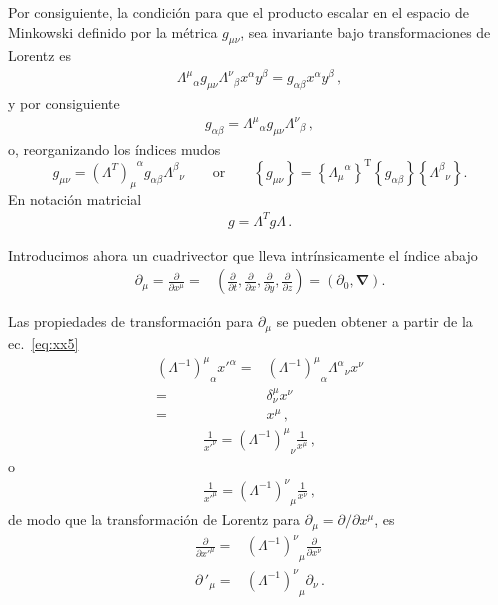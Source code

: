 \begin{frame}
Por consiguiente, la condición para que el producto escalar  en el espacio de Minkowski definido por la métrica $g_{\mu\nu}$, sea invariante bajo transformaciones de Lorentz es
\begin{align}
  {\Lambda^{\mu}}_{\alpha}g_{\mu\nu}{\Lambda^{\nu}}_{\beta}x^{\alpha}y^{\beta}=
  g_{\alpha\beta}x^{\alpha}y^{\beta}\,,
\end{align}
y por consiguiente
\begin{align}
  g_{\alpha\beta}={\Lambda^{\mu}}_{\alpha}g_{\mu\nu}{\Lambda^{\nu}}_{\beta}\,,
\end{align}
o, reorganizando los índices mudos
\begin{equation}
  \label{eq:lrinv}
  g_{\mu\nu}={(\Lambda^{T})_{\mu}}^\alpha g_{\alpha\beta}{\Lambda^\beta}_{\nu}\qquad\text{or}\qquad 
\left\{g_{\mu\nu}\right\}=\left\{{\Lambda_{\mu}}^{\alpha}\right\}^{\text{T}}\left\{g_{\alpha\beta}\right\}\left\{{\Lambda^\beta}_{\nu}\right\}.
\end{equation}
En notaci\'on matricial
\begin{align}
 g=\Lambda^T g \Lambda\,. 
\end{align}

Introducimos ahora un cuadrivector que lleva intrínsicamente el índice abajo
\begin{align}
   \partial_\mu=\frac{\partial}{\partial x^\mu}=&\left(
    \frac{\partial}{\partial t},\frac{\partial}{\partial x},\frac{\partial}{\partial y},\frac{\partial}{\partial z}
  \right)
  =(\partial_0,\boldsymbol{\nabla}).
\end{align}



Las propiedades de transformación para $\partial_\mu$ se pueden obtener a partir de la ec.~\eqref{eq:xx5}
\begin{align}
  {\left(\Lambda^{-1}\right)^\mu}_\alpha{x'}^\alpha=&{\left(\Lambda^{-1}\right)^\mu}_\alpha{\Lambda^\alpha}_\nu x^\nu\nonumber\\
=&\delta^\mu_\nu x^\nu\nonumber\\
=&x^\mu\,,
\end{align}
\begin{align}
  \frac{1}{{x'}^\nu}= {\left(\Lambda^{-1}\right)^\mu}_\nu\frac{1}{x^\mu}\,,
\end{align}
o
\begin{align}
  \label{eq:183qft}
    \frac{1}{{x'}^\mu}= {\left(\Lambda^{-1}\right)^\nu}_\mu\frac{1}{x^\nu}\,,
\end{align}
de modo que la transformación de Lorentz para $\partial_\mu=\partial/\partial x^\mu$, es
\begin{align}
  \label{dmulrtran}
   \frac{\partial}{{\partial x'}^\mu}=& {\left(\Lambda^{-1}\right)^\nu}_\mu\frac{\partial}{\partial x^\nu}\nonumber\\
   {\partial\,}'_\mu=& {\left(\Lambda^{-1}\right)^\nu}_\mu\partial_\nu\,.
\end{align}


\end{frame}
